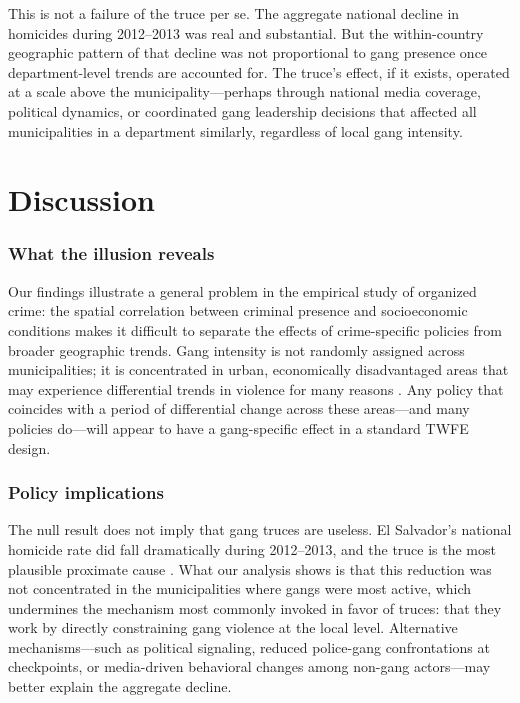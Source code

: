 \documentclass[12pt]{article}
\begin{document}
This is not a failure of the truce per se. The aggregate national decline in homicides during 2012--2013 was real and substantial. But the within-country geographic pattern of that decline was not proportional to gang presence once department-level trends are accounted for. The truce's effect, if it exists, operated at a scale above the municipality---perhaps through national media coverage, political dynamics, or coordinated gang leadership decisions that affected all municipalities in a department similarly, regardless of local gang intensity.


\section{Discussion}

\subsubsection*{What the illusion reveals} Our findings illustrate a general problem in the empirical study of organized crime: the spatial correlation between criminal presence and socioeconomic conditions makes it difficult to separate the effects of crime-specific policies from broader geographic trends. Gang intensity is not randomly assigned across municipalities; it is concentrated in urban, economically disadvantaged areas that may experience differential trends in violence for many reasons \citep{soares_naritomi2010}. Any policy that coincides with a period of differential change across these areas---and many policies do---will appear to have a gang-specific effect in a standard TWFE design.

\subsubsection*{Policy implications} The null result does not imply that gang truces are useless. El Salvador's national homicide rate did fall dramatically during 2012--2013, and the truce is the most plausible proximate cause \citep{cruz_duran2016}. What our analysis shows is that this reduction was not concentrated in the municipalities where gangs were most active, which undermines the mechanism most commonly invoked in favor of truces: that they work by directly constraining gang violence at the local level. Alternative mechanisms---such as political signaling, reduced police-gang confrontations at checkpoints, or media-driven behavioral changes among non-gang actors---may better explain the aggregate decline.
\end{document}
